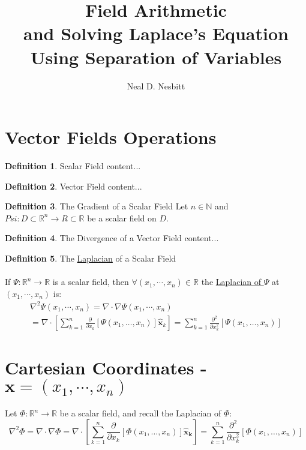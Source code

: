\documentclass{article}	%
\title{ Field Arithmetic\\
and
Solving Laplace's Equation\\
Using Separation of Variables
}
\author{Neal D. Nesbitt}
\theoremstyle{definition}
\newtheorem{definition}{Definition}[section]
\begin{document}
\maketitle


\section{Vector Fields Operations}

\begin{definition}{Scalar Field}
content...
\end{definition}

\begin{definition}{Vector Field}
content...
\end{definition}

\begin{definition}{The Gradient of a Scalar Field}
Let $n\in\mathbb{N}$ and $Psi: D\subset\mathbb{R}^{n} \to R\subset\mathbb{R}$ be a scalar field on $D$.
\end{definition}

\begin{definition}{The Divergence of a Vector Field}
content...
\end{definition}

\begin{definition}{ The \underline{Laplacian} of a Scalar Field\\\\}
If $\Psi:\mathbb{R}^{n}\to\mathbb{R}$ is a scalar field, then $\forall (x_{1},\cdots,x_{n})\in\mathbb{R}$ the \underline{Laplacian of $\Psi$} at $(x_{1},\cdots,x_{n})$ is:
\begin{multline}
\nabla^{2}\Psi(x_{1},\cdots,x_{n}) = \nabla \cdot \nabla \Psi(x_{1},\cdots,x_{n}) \\
= \nabla \cdot \left[ \sum_{k=1}^{n}\frac{\partial}{\partial x_{k}} \left[ \Psi(x_{1},\dots,x_{n}) \right] \mathbf{\hat{x}}_{k} \right] = \sum_{k=1}^{n}\frac{\partial^{2}}{\partial x_{k}^{2}} \left[ \Psi(x_{1},\dots,x_{n}) \right]
\end{multline}
\end{definition}

\section{Cartesian Coordinates - $\mathbf{x}=(x_{1},\cdots,x_{n})$}
Let $\Phi:\mathbb{R}^{n}\to\mathbb{R}$ be a scalar field, and recall the Laplacian of $\Phi$:
\[ \nabla^{2}\Phi = \nabla \cdot \nabla \Phi = \nabla \cdot \left[ \sum_{k=1}^{n}\frac{\partial}{\partial x_{k}} \left[ \Phi(x_{1},\dots,x_{n}) \right] \mathbf{\hat{x}_{k}} \right] = \sum_{k=1}^{n}\frac{\partial^{2}}{\partial x_{k}^{2}} \left[ \Phi(x_{1},\dots,x_{n}) \right] \]
\end{document}
